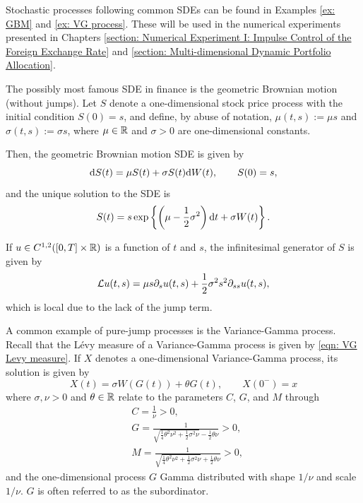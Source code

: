 Stochastic processes following common SDEs can be found in Examples \ref{ex: GBM} and \ref{ex: VG process}. These will be used in the numerical experiments presented in Chapters \ref{section: Numerical Experiment I: Impulse Control of the Foreign Exchange Rate} and \ref{section: Multi-dimensional Dynamic Portfolio Allocation}.
\begin{example}
\label{ex: GBM}
    The possibly most famous SDE in finance is the geometric Brownian motion (without jumps). Let $S$ denote a one-dimensional stock price process with the initial condition $S(0)=s$, and define, by abuse of notation, $\mu(t,s) := \mu s$ and $\sigma(t,s):=\sigma s$, where $\mu \in \mathbb{R}$ and $\sigma>0$ are one-dimensional constants.
    
    Then, the geometric Brownian motion SDE is given by 
    \begin{equation*}
        \mathrm{d} S(t) = \mu S(t) + \sigma S(t) \mathrm{d} W(t), \qquad S(0)=s,
    \end{equation*}
    and the unique solution to the SDE is
    \begin{equation*}
        S(t) = s \exp\left\{\left(\mu - \frac{1}{2}\sigma^2 \right) \mathrm{d} t + \sigma W(t)\right\}. 
    \end{equation*}

    If $u\in C^{1,2}([0,T] \times \mathbb{R})$ is a function of $t$ and $s$, the infinitesimal generator of $S$ is given by
    \begin{equation*}
        \mathcal{L} u(t,s) = \mu s \partial_su(t,s) + \frac{1}{2} \sigma^2 s^2 \partial_{ss} u(t,s),
    \end{equation*}
    which is local due to the lack of the jump term.  
\end{example}
\begin{example}
\label{ex: VG process}
    A common example of pure-jump processes is the Variance-Gamma process. Recall that the Lévy measure of a Variance-Gamma process is given by \eqref{eqn: VG Levy measure}. If $X$ denotes a one-dimensional Variance-Gamma process, its solution is given by
    \begin{equation*}
        X(t) = \sigma W(G(t)) + \theta G(t), \qquad X(0^-) = x
    \end{equation*}
    where $\sigma, \nu > 0$ and $\theta \in \mathbb{R}$ relate to the parameters $C$, $G$, and $M$ through
    \begin{align*}
        & C = \frac{1}{\nu} > 0,\\
        & G = \frac{1}{\sqrt{\frac{1}{4} \theta^2 \nu^2 + \frac{1}{2}\sigma^2\nu} - \frac{1}{2}\theta\nu} > 0, \\
        & M = \frac{1}{\sqrt{\frac{1}{4} \theta^2 \nu^2 + \frac{1}{2}\sigma^2\nu} + \frac{1}{2}\theta\nu} > 0,
    \end{align*}
    and the one-dimensional process $G$ Gamma distributed with shape $1/\nu$ and scale $1/\nu$. $G$ is often referred to as the subordinator. 
\end{example}

